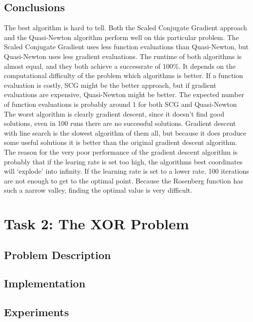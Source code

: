 \documentclass{article}
\begin{document}
\subsection{Conclusions}
The best algorithm is hard to tell. Both the Scaled Conjugate Gradient approach and the Quasi-Newton algorithm perform well on this particular problem. The Scaled Conjugate Gradient uses less function evaluations than Quasi-Newton, but Quasi-Newton uses less gradient evaluations. The runtime of both algorithms is almost equal, and they both achieve a successrate of 100\%. It depends on the computational difficulty of the problem which algorithms is better. If a function evaluation is costly, SCG might be the better approach, but if gradient evaluations are expensive, Quasi-Newton might be better. The expected number of function evaluations is probably around 1 for both SCG and Quasi-Newton
The worst algorithm is clearly gradient descent, since it doesn't find good solutions, even in 100 runs there are no successful solutions. Gradient descent with line search is the slowest algorithm of them all, but because it does produce some useful solutions it is better than the original gradient descent algorithm.
The reason for the very poor performance of the gradient descent algorithm is probably that if the learing rate is set too high, the algorithms best coordinates will `explode' into infinity. If the learning rate is set to a lower rate, 100 iterations are not enough to get to the optimal point. Because the Rosenberg function has such a narrow valley, finding the optimal value is very difficult.

\newpage
\section{Task 2: The XOR Problem}
\subsection{Problem Description}

\subsection{Implementation}

\subsection{Experiments}
\end{document}

